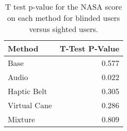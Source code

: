
\begin{table}[!htb]
\centering
\caption{T test p-value for the NASA score on each method for blinded users versus sighted users.}
\label{tab:ttest_nasa_score}
\begin{tabular}{lr}
\toprule
      Method &  T-Test P-Value \\
\midrule
        Base &           0.577 \\
       Audio &           0.022 \\
 Haptic Belt &           0.305 \\
Virtual Cane &           0.286 \\
     Mixture &           0.809 \\
\bottomrule
\end{tabular}
\end{table}

